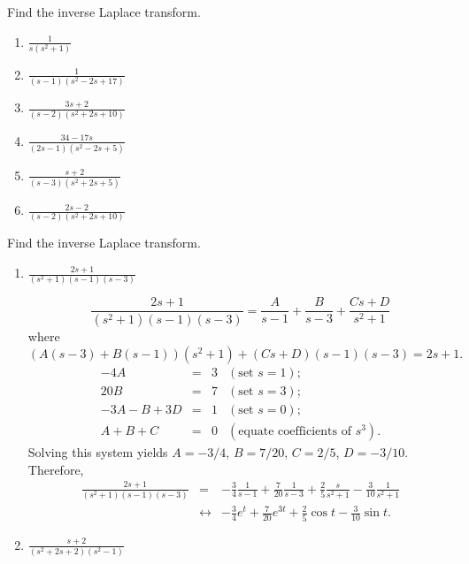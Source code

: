 \documentclass{ximera}
\begin{document}
\begin{problem}\label{exer:8.2.7}
Find the inverse Laplace transform.

\begin{enumerate}
    \item $\frac{1}{s(s^2+1)}$
    \item $\frac{1}{(s-1)(s^2-2s+17)}$
    \item $\frac{3s+2}{(s-2)(s^2+2s+10)}$
    \item $\frac{34-17s}{(2s-1)(s^2-2s+5)}$
    \item $\frac{s+2}{(s-3)(s^2+2s+5)}$
    \item $\frac{2s-2}{(s-2)(s^2+2s+10)}$
\end{enumerate}
\end{problem}

\begin{problem}\label{exer:8.2.8}
 Find the inverse Laplace transform.
\begin{enumerate}
\item $\frac{2s+1}{(s^2+1)(s-1)(s-3)}$

\begin{solution}
$$
\frac{2s+1}{(s^2+1)(s-1)(s-3)}
=\frac{A}{s-1}+\frac{B}{s-3}+\frac{Cs+D}{s^2+1}
$$
where
$$
(A(s-3)+B(s-1))(s^2+1)+(Cs+D)(s-1)(s-3)=2s+1.
$$
$$
\begin{array}{rcrl}
-4A&=&3&(\mbox{set }s=1);\\
20B&=&7& (\mbox{set }s=3);\\
-3A-B+3D&=&1& (\mbox{set }s=0);\\
A+B+C&=&0&(\mbox{equate coefficients of }s^3).
\end{array}
$$
Solving this system yields $A=-3/4$, $B=7/20$,
$C=2/5$, $D=-3/10$. Therefore,
\begin{eqnarray*}
\frac{2s+1}{(s^2+1)(s-1)(s-3)}
&=&
-\frac{3}{4}\frac{1}{s-1}+\frac{7}{20}\frac{1}{s-3}+\frac{2}{5}\frac{s}{s^2+1}-\frac{3}{10}\frac{1}{s^2+1}
\\&\leftrightarrow&
-\frac{3}{4}e^t+\frac{7}{20}e^{3t}+\frac{2}{5}\cos t-\frac{3}{10}\sin t.
\end{eqnarray*}
\end{solution}

\item $\frac{s+2}{(s^2+2s+2)(s^2-1)}$


\end{enumerate}
\end{problem}
\end{document}
